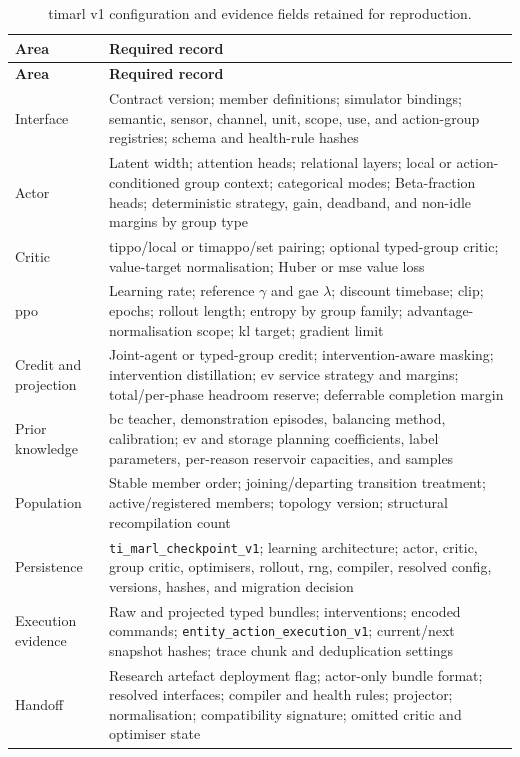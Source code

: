 \begin{longtable}{@{}p{}p{}@{}}
\caption{\gls{timarl} v1 configuration and evidence fields retained for reproduction.}\label{tab:app-timarl-contract}\\
\toprule
\textbf{Area} & \textbf{Required record} \\
\midrule
\endfirsthead
\toprule
\textbf{Area} & \textbf{Required record} \\
\midrule
\endhead
Interface & Contract version; member definitions; simulator bindings; semantic, sensor, channel, unit, scope, use, and action-group registries; schema and health-rule hashes \\
Actor & Latent width; attention heads; relational layers; local or action-conditioned group context; categorical modes; Beta-fraction heads; deterministic strategy, gain, deadband, and non-idle margins by group type \\
Critic & \gls{tippo}/local or \gls{timappo}/set pairing; optional typed-group critic; value-target normalisation; Huber or \gls{mse} value loss \\
\gls{ppo} & Learning rate; reference $\gamma$ and \gls{gae} $\lambda$; discount timebase; clip; epochs; rollout length; entropy by group family; advantage-normalisation scope; \gls{kl} target; gradient limit \\
Credit and projection & Joint-agent or typed-group credit; intervention-aware masking; intervention distillation; \gls{ev} service strategy and margins; total/per-phase headroom reserve; deferrable completion margin \\
Prior knowledge & \gls{bc} teacher, demonstration episodes, balancing method, calibration; \gls{ev} and storage planning coefficients, label parameters, per-reason reservoir capacities, and samples \\
Population & Stable member order; joining/departing transition treatment; active/registered members; topology version; structural recompilation count \\
Persistence & \texttt{ti\_marl\_checkpoint\_v1}; learning architecture; actor, critic, group critic, optimisers, rollout, \gls{rng}, compiler, resolved config, versions, hashes, and migration decision \\
Execution evidence & Raw and projected typed bundles; interventions; encoded commands; \texttt{entity\_action\_execution\_v1}; current/next snapshot hashes; trace chunk and deduplication settings \\
Handoff & Research artefact deployment flag; actor-only bundle format; resolved interfaces; compiler and health rules; projector; normalisation; compatibility signature; omitted critic and optimiser state \\
\bottomrule
\end{longtable}


